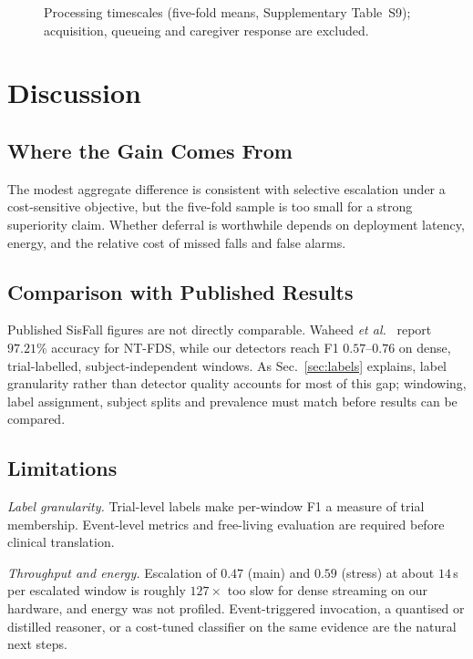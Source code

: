 \documentclass[journal]{IEEEtran}
\begin{document}
\begin{figure}[!t]
\centering
\resizebox{\linewidth}{!}{}
\caption{Processing timescales (five-fold means, Supplementary Table~S9); acquisition, queueing and caregiver response are excluded.}
\label{fig:timeline}
\end{figure}

\section{Discussion}
\label{sec:discussion}

\subsection{Where the Gain Comes From}
The modest aggregate difference is consistent with selective escalation under a
cost-sensitive objective, but the five-fold sample is too small for a strong
superiority claim. Whether deferral is worthwhile depends on deployment
latency, energy, and the relative cost of missed falls and false alarms.

\subsection{Comparison with Published Results}
Published SisFall figures are not directly comparable. Waheed \textit{et al.}~\cite{waheed2021ntfds} report $97.21\%$ accuracy for NT-FDS, while our detectors reach F1 $0.57$--$0.76$ on dense, trial-labelled, subject-independent windows. As Sec.~\ref{sec:labels} explains, label granularity rather than detector quality accounts for most of this gap; windowing, label assignment, subject splits and prevalence must match before results can be compared.

\subsection{Limitations}
\label{sec:limitations}
\emph{Label granularity.} Trial-level labels make per-window F1 a measure of
trial membership. Event-level metrics and free-living evaluation are required
before clinical translation.

\emph{Throughput and energy.} Escalation of $0.47$ (main) and $0.59$ (stress) at about $14$\,s per escalated window is roughly $127\times$ too slow for dense streaming on our hardware, and energy was not profiled. Event-triggered invocation, a quantised or distilled reasoner, or a cost-tuned classifier on the same evidence are the natural next steps.
\end{document}
